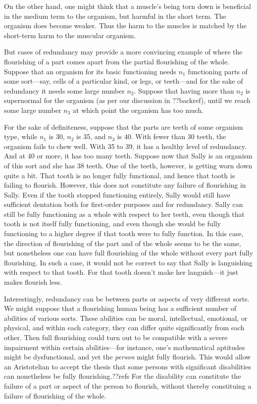 On the other hand, one might think that a muscle's being torn down is beneficial in the medium term to the organism,
but harmful in the short term. The organism does become weaker. Thus the harm to the muscles is matched by the 
short-term harm to the muscular organism.

But cases of redundancy may provide a more convincing example of where the flourishing of a part comes apart from
the partial flourishing of the whole. Suppose that an organism for its basic functioning needs $n_1$ functioning parts of some sort---say,
cells of a particular kind, or legs, or teeth---and for the sake of redundancy it needs some large number $n_2$.
Suppose that having more than $n_2$ is supernormal for the organism (as per our discussion in ??backref), until we
reach some large number $n_3$ at which point the organism has too much.  

For the sake of definiteness, suppose that the parts are teeth of some organism type, while $n_1$ is 30, $n_2$ is 35, and $n_3$ is 40. With fewer
than 30 teeth, the organism fails to chew well. With 35 to 39, it has a healthy level of redundancy. And at 40 or more,
it has too many teeth. Suppose now that Sally is an organism of this sort and she has 38 teeth. One of the teeth, however,
is getting worn down quite a bit. That tooth is no longer fully functional, and hence that tooth is failing to flourish.
However, this does not constitute any failure of flourishing in Sally. Even if the tooth stopped functioning entirely,
Sally would still have sufficient dentation both for first-order purposes and for redundancy. Sally can still be fully
functioning as a whole with respect to her teeth, even though that tooth is not itself fully functioning, and even though
she would be fully functioning to a higher degree if that tooth were to fully function. In this case, the direction of
flourishing of the part and of the whole seems to be the same, but nonetheless one can have full flourishing of the whole
without every part fully flourishing. In such a case, it would not be correct to say that Sally is languishing with respect
to that tooth. For that tooth doesn't make her languish---it just makes flourish less.

Interestingly, redundancy can be between parts or aspects of very different sorts. We might suppose that a flourishing human 
being has a sufficient number of abilities of various sorts. These abilities can be moral, intellectual, emotional, or physical, and
within each category, they can differ quite significantly from each other. Then full flourishing could turn out to be compatible with a severe
impairment within certain abilities---for instance, one's mathematical aptitudes might be dysfunctional, and yet the \textit{person} 
might fully flourish. This would allow an Aristotelian to accept the thesis that some persons with significant disabilities can nonetheless
be fully flourishing.??refs For the disability can constitute the failure of a part or aspect of the person to flourish, without
thereby constituing a failure of flourishing of the whole. 

